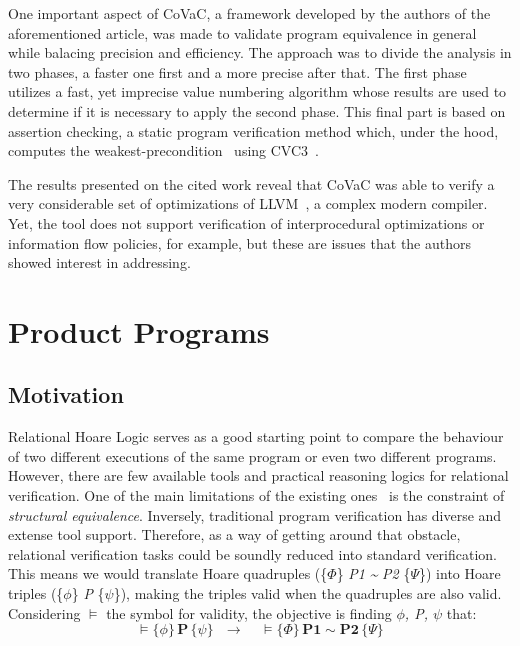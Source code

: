 One important aspect of CoVaC, a framework developed by the authors of the aforementioned article, was made to validate program equivalence in general while balacing precision and efficiency.
The approach was to divide the analysis in two phases, a faster one first and a more precise after that.
The first phase utilizes a fast, yet imprecise value numbering algorithm whose results are used to determine if it is necessary to apply the second phase. 
This final part is based on assertion checking, a static program verification method which, under the hood, computes the weakest-precondition~\cite{DBLP:books/ph/Dijkstra76} using CVC3~\cite{cvc3}. 

The results presented on the cited work reveal that CoVaC was able to verify a very considerable set of optimizations of LLVM~\cite{llvm}, a complex modern compiler.
Yet, the tool does not support verification of interprocedural optimizations or information flow policies, for example, but these are issues that the authors showed interest in addressing.


\section{Product Programs} 
\label{sec:product_programs}

\subsection{Motivation} 
\label{subsec:product_programs_motivation}

Relational Hoare Logic serves as a good starting point to compare the behaviour of two different executions of the same program or even two different programs.
However, there are few available tools and practical reasoning logics for relational verification.
One of the main limitations of the existing ones~\cite{DBLP:conf/popl/Benton04, DBLP:journals/tcs/Yang07} is the constraint of \emph{structural equivalence}.
Inversely, traditional program verification has diverse and extense tool support.
Therefore, as a way of getting around that obstacle, relational verification tasks could be soundly reduced into standard verification.
This means we would translate Hoare quadruples (\{$\Phi$\} \emph{P1} \emph{\textasciitilde} \emph{P2} \{$\Psi$\}) into Hoare triples (\{$\phi$\} \emph{P} \{$\psi$\}), making the triples valid when the quadruples are also valid.
Considering $\vDash$ the symbol for validity, the objective is finding \emph{$\phi$, P, $\psi$} that:
\[ \vDash \{\phi\} \, \textbf{P} \, \{\psi\} \ \ \ \rightarrow \ \ \ \ \ \vDash \{\Phi\} \, \textbf{P1} \sim \textbf{P2} \, \{\Psi\} \]

